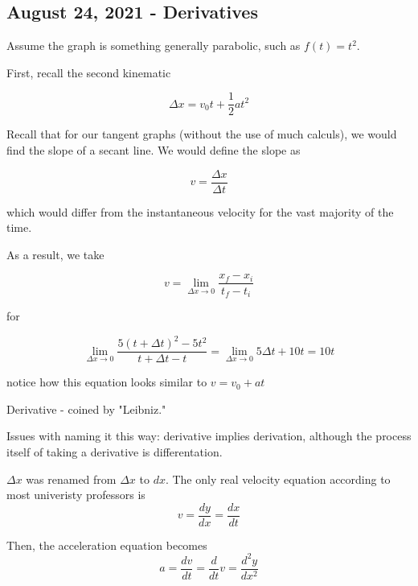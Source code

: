 \usepackage{standalone}
\usepackage{chez}




\subsection{August 24, 2021 - Derivatives}

\begin{example}[Parabolic]

Assume the graph is something generally parabolic, such as $f(t) = t^2$.

First, recall the second kinematic

$$
\Delta x = v_0t + \frac{1}{2}at^2
$$

Recall that for our tangent graphs (without the use of much calculs), we would
find the slope of a secant line. We would define the slope as

$$
v = \frac{\Delta x}{\Delta t}
$$

which would differ from the instantaneous velocity for the vast majority of the
time.

As a result, we take

$$
v = \lim_{\Delta x \rightarrow 0}\frac{x_f - x_i}{t_f - t_i}
$$

for

$$
\lim_{\Delta x \rightarrow 0}\frac{5(t + \Delta t)^2 - 5t^2}{t + \Delta t - t}
= \lim_{\Delta x \rightarrow 0}5\Delta t + 10t = 10t
$$

notice how this equation looks similar to $v = v_0 + at$ 

\end{example}

\begin{remark}
	Derivative - coined by "Leibniz."
	
	Issues with naming it this way: derivative implies derivation, although the
	process itself of taking a derivative is differentation.

	$\Delta x$ was renamed from $\Delta x$ to $dx$. The only real velocity equation
	according to most univeristy professors is $$v = \frac{dy}{dx} = \frac{dx}{dt}$$

	Then, the acceleration equation becomes
	$$a = \frac{dv}{dt} = \frac{d}{dt}v = \frac{d^2y}{dx^2}$$
\end{remark}

